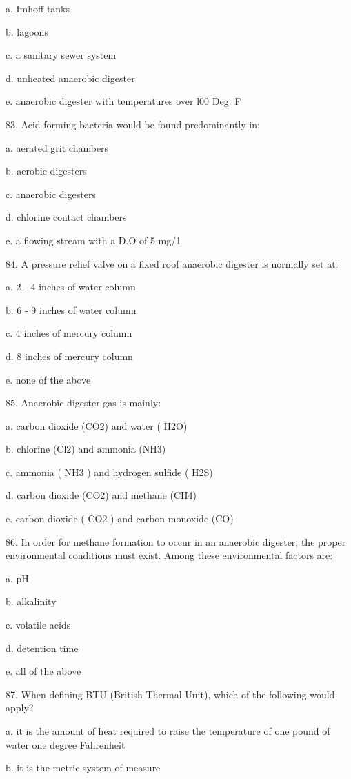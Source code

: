 \documentclass{article}
\begin{document}
a. Imhoff tanks 

b. lagoons 

c. a sanitary sewer system 

d. unheated anaerobic digester 

e. anaerobic digester with temperatures over l00 Deg. F 


83. Acid-forming bacteria would be found predominantly in: 

a. aerated grit chambers 

b. aerobic digesters 

c. anaerobic digesters 

d. chlorine contact chambers 

e. a flowing stream with a D.O of 5 mg/1 


84. A pressure relief valve on a fixed roof anaerobic digester is normally set at: 

a. 2 - 4 inches of water column 

b. 6 - 9 inches of water column 

c. 4 inches of mercury column 

d. 8 inches of mercury column 

e. none of the above 


85. Anaerobic digester gas is mainly: 

a. carbon dioxide (CO2) and water ( H2O) 

b. chlorine (Cl2) and ammonia (NH3) 

c. ammonia ( NH3 ) and hydrogen sulfide ( H2S) 

d. carbon dioxide (CO2) and methane (CH4) 

e. carbon dioxide ( CO2 ) and carbon monoxide (CO) 


86. In order for methane formation to occur in an anaerobic digester, the proper environmental conditions must exist. Among these environmental factors are: 

a. pH 

b. alkalinity 

c. volatile acids 

d. detention time 

e. all of the above 


87. When defining BTU (British Thermal Unit), which of the following would apply? 

a. it is the amount of heat required to raise the temperature of one pound of water one degree Fahrenheit 

b. it is the metric system of measure 
\end{document}
